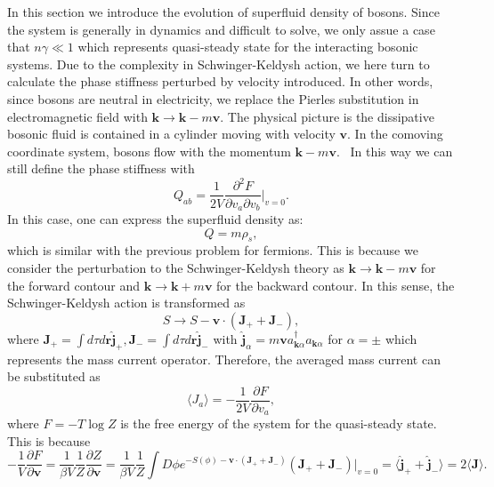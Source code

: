 \documentclass{article}
\newcommand{\nobracket}{}
\newcommand{\tmmathbf}[1]{\ensuremath{\boldsymbol{#1}}}
\begin{document}
In this section we introduce the evolution of superfluid density of bosons.
Since the system is generally in dynamics and difficult to solve, we only
assue a case that $n \gamma \ll 1$ which represents quasi-steady state for the
interacting bosonic systems. Due to the complexity in Schwinger-Keldysh
action, we here turn to calculate the phase stiffness perturbed by velocity
introduced. In other words, since bosons are neutral in electricity, we
replace the Pierles substitution in electromagnetic field with $\tmmathbf{k}
\rightarrow \tmmathbf{k}- m\tmmathbf{v}$. The physical picture is the
dissipative bosonic fluid is contained in a cylinder moving with velocity
$\tmmathbf{v}$. In the comoving coordinate system, bosons flow with the
momentum $\tmmathbf{k}- m\tmmathbf{v}$. \ In this way we can still define the
phase stiffness with
\begin{equation}
  Q_{a b} = \frac{1}{2 V} \frac{\partial^2 F}{\partial v_a \partial v_b} |_{v
  = 0} \nobracket . \label{Qv}
\end{equation}
In this case, one can express the superfluid density as:
\begin{equation}
  Q = m \rho_s,
\end{equation}
which is similar with the previous problem for fermions. This is because we
consider the perturbation to the Schwinger-Keldysh theory as $\tmmathbf{k}
\rightarrow \tmmathbf{k}- m\tmmathbf{v}$ for the forward contour and
$\tmmathbf{k} \rightarrow \tmmathbf{k}+ m\tmmathbf{v}$ for the backward
contour. In this sense, the Schwinger-Keldysh action is transformed as
\begin{equation}
  S \rightarrow S -\tmmathbf{v} \cdot (\tmmathbf{J}_+ +\tmmathbf{J}_-),
\end{equation}
where $\tmmathbf{J}_+ = \int d \tau d\tmmathbf{r} \hat{\tmmathbf{j}}_+,
\tmmathbf{J}_- = \int d \tau d\tmmathbf{r} \hat{\tmmathbf{j}}_-$ with
$\hat{\tmmathbf{j}}_{\alpha} = m\tmmathbf{v}a_{\tmmathbf{k} \alpha}^{\dagger}
a_{\tmmathbf{k} \alpha}$ for $\alpha = \pm$ which represents the mass current
operator. Therefore, the averaged mass current can be substituted as
\begin{equation}
  \langle J_a \rangle = - \frac{1}{2 V} \frac{\partial F}{\partial v_a},
\end{equation}
where $F = - T \log Z$ is the free energy of the system for the quasi-steady
state. This is because
\begin{equation}
  - \frac{1}{V} \frac{\partial F}{\partial \tmmathbf{v}} = \frac{1}{\beta V}
  \frac{1}{Z} \frac{\partial Z}{\partial \tmmathbf{v}} = \frac{1}{\beta V}
  \frac{1}{Z} \int D \phi e^{- S (\phi) -\tmmathbf{v} \cdot (\tmmathbf{J}_+
  +\tmmathbf{J}_-)} (\tmmathbf{J}_+ +\tmmathbf{J}_-) |_{v = 0} \nobracket =
  \langle \hat{\tmmathbf{j}}_+ + \hat{\tmmathbf{j}}_- \rangle = 2 \langle
  \tmmathbf{J} \rangle .
\end{equation}
\end{document}
